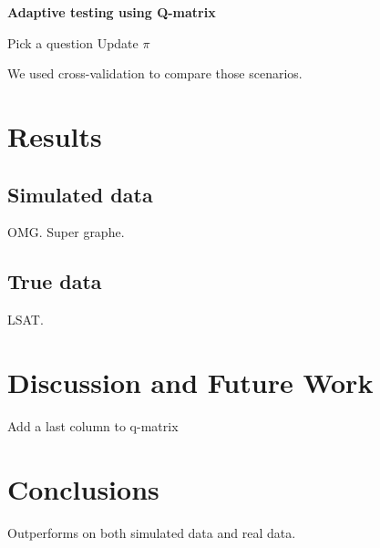 \documentclass{sig-alternate}
\begin{document}
\begin{algorithm}
\caption*{\textbf{Adaptive testing using Q-matrix}}
\begin{algorithmic}
	\State Pick a question
	\State Update $\pi$
\EndWhile
\EndProcedure
\end{algorithmic}
\end{algorithm}

We used cross-validation to compare those scenarios.

\section{Results}

\subsection{Simulated data}

OMG. Super graphe.

\subsection{True data}

LSAT.

\section{Discussion and Future Work}

Add a last column to q-matrix

\section{Conclusions}

Outperforms on both simulated data and real data.

%


%
%

\end{document}
